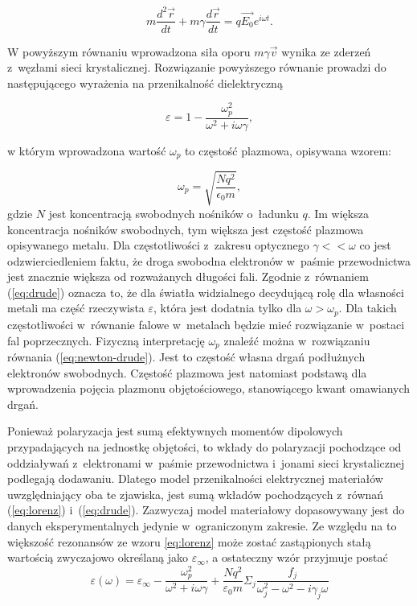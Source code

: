 \begin{equation}
m \frac{d^2\vec{r}}{dt} + m \gamma \frac{d\vec{r}}{dt} = q \vec{E_0}e^{i\omega t}.
\label{eq:newton-drude}
\end{equation}

W powyższym równaniu wprowadzona siła oporu $m \gamma \vec{v}$ wynika ze zderzeń z~węzłami sieci krystalicznej. Rozwiązanie powyższego równanie prowadzi do następującego wyrażenia na przenikalność dielektryczną

\begin{equation}
\varepsilon= 1 - \frac{\omega_p^2}{\omega^2+i\omega \gamma},
\label{eq:drude}
\end{equation}

w którym wprowadzona wartość $\omega_p$ to częstość plazmowa, opisywana wzorem:

\begin{equation}
\omega_p = \sqrt{\frac{N q^2}{\epsilon_0 m}},
\label{eq:omega-plazmowa}
\end{equation}
gdzie $N$ jest koncentracją swobodnych nośników o~ładunku $q$. Im większa koncentracja nośników swobodnych, tym większa jest częstość plazmowa opisywanego metalu.  Dla częstotliwości z~zakresu optycznego $\gamma<<\omega$ co jest odzwierciedleniem faktu, że droga swobodna elektronów w~paśmie przewodnictwa jest znacznie większa od rozważanych długości fali. Zgodnie z~równaniem  (\ref{eq:drude}) oznacza to, że dla światła widzialnego decydującą rolę dla własności metali ma część rzeczywista $\varepsilon$, która jest dodatnia tylko dla $\omega>\omega_p$. Dla takich częstotliwości w~równanie falowe w~metalach będzie mieć rozwiązanie w~postaci fal poprzecznych. Fizyczną interpretację $\omega_p$ znaleźć można w~rozwiązaniu równania (\ref{eq:newton-drude}). Jest to częstość własna drgań podłużnych elektronów swobodnych. Częstość plazmowa jest natomiast podstawą dla wprowadzenia pojęcia plazmonu objętościowego, stanowiącego kwant omawianych drgań.

Ponieważ polaryzacja jest sumą efektywnych momentów dipolowych przypadających na jednostkę objętości, to wkłady do polaryzacji pochodzące od oddziaływań z~elektronami w~paśmie przewodnictwa i~jonami sieci krystalicznej podlegają dodawaniu. Dlatego model przenikalności elektrycznej materiałów uwzględniający oba te zjawiska, jest sumą wkładów pochodzących z~równań (\ref{eq:lorenz}) i~(\ref{eq:drude}). Zazwyczaj model materiałowy dopasowywany jest do danych eksperymentalnych jedynie w~ograniczonym zakresie. Ze względu na to większość rezonansów ze wzoru \ref{eq:lorenz} może zostać zastąpionych stałą wartością zwyczajowo określaną jako $\varepsilon_\infty$, a ostateczny wzór przyjmuje postać
\begin{equation}
\varepsilon(\omega)=\varepsilon_\infty- \frac{\omega_p^2}{\omega^2+i\omega\gamma} +\frac{Nq^2}{\varepsilon_0 m} \Sigma_j \frac{f_j}{\omega_j^2-\omega^2-i\gamma_j\omega}
\label{eq:lorenz-drude}
\end{equation}
